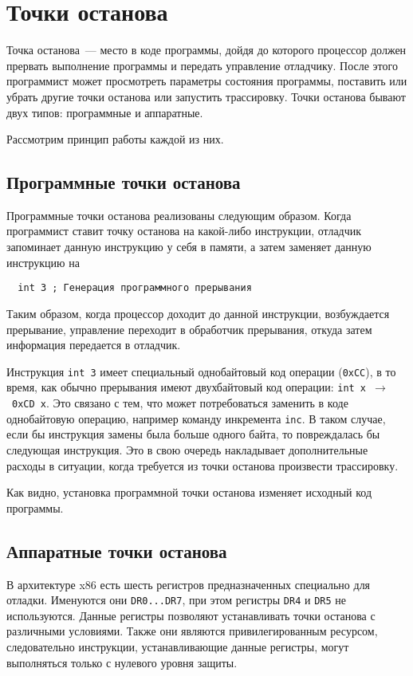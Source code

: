 
\section{Точки останова}
Точка останова~--- место в коде программы, дойдя до которого процессор должен
прервать выполнение программы и передать управление отладчику. После этого
программист может просмотреть параметры состояния программы, поставить или
убрать другие точки останова или запустить трассировку. Точки останова бывают
двух типов: программные и аппаратные.

Рассмотрим принцип работы каждой из них.

\subsection{Программные точки останова}
Программные точки останова реализованы следующим образом. Когда программист
ставит точку останова на какой-либо инструкции, отладчик запоминает данную
инструкцию у себя в памяти, а затем заменяет данную инструкцию на 
\begin{verbatim}
  int 3 ; Генерация программного прерывания
\end{verbatim}
Таким образом, когда процессор доходит до данной инструкции, возбуждается
прерывание, управление переходит в обработчик прерывания, откуда затем
информация передается в отладчик. 

Инструкция \verb!int 3! имеет специальный однобайтовый код операции
(\verb!0xCC!), в то время, как обычно прерывания имеют двухбайтовый код
операции: \verb!int x!~$\to$~\verb!0xCD x!. Это связано с тем, что может
потребоваться заменить в коде однобайтовую операцию, например команду инкремента
\verb!inc!. В таком случае, если бы инструкция замены была больше одного
байта, то повреждалась бы следующая инструкция. Это в свою очередь накладывает
дополнительные расходы в ситуации, когда требуется из точки останова произвести
трассировку.

Как видно, установка программной точки останова изменяет исходный код
программы.

\subsection{Аппаратные точки останова}
В архитектуре x86 есть шесть регистров предназначенных специально для отладки.
Именуются они \verb!DR0...DR7!, при этом регистры \verb!DR4! и \verb!DR5! не
используются. Данные регистры позволяют устанавливать точки останова с
различными условиями. Также они являются привилегированным ресурсом,
следовательно инструкции, устанавливающие данные регистры, могут выполняться
только с нулевого уровня защиты.

